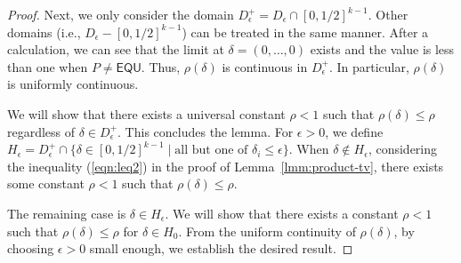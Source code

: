 \documentclass[letterpaper,11pt]{article}
\newcommand{\equ}{\textsf{EQU}\xspace}
\begin{document}
\begin{proof}
  Next, we only consider the domain $D_\epsilon^{+}=D_\epsilon\cap[0,1/2]^{k-1}$.
  Other domains (i.e., $D_\epsilon-[0,1/2]^{k-1}$) can be treated in the same manner.
  After a calculation,
  we can see that the limit at $\delta=(0,\ldots,0)$ exists and the value is less than one when $P\neq \equ$.
  Thus, $\rho(\delta)$ is continuous in $D_\epsilon^{+}$.
  In particular, $\rho(\delta)$ is uniformly continuous.

  We will show that there exists a universal constant $\rho<1$ such that $\rho(\delta)\leq \rho$ regardless of $\delta \in D_{\epsilon}^{+}$.
  This concludes the lemma.
  For $\epsilon>0$, 
  we define $H_\epsilon=D_{\epsilon}^{+}\cap \{\delta\in [0,1/2]^{k-1}\mid \mbox{all but one of }\delta_i \leq \epsilon \}$.
  When $\delta \not \in  H_{\epsilon}$, 
  considering the inequality (\ref{eqn:leq2}) in the proof of Lemma~\ref{lmm:product-tv},
  there exists some constant $\rho<1$ such that $\rho(\delta)\leq \rho$.

  The remaining case is $\delta\in H_\epsilon$.
  We will show that there exists a constant $\rho<1$ such that $\rho(\delta)\leq \rho$ for $\delta\in H_0$.
  From the uniform continuity of $\rho(\delta)$, 
  by choosing $\epsilon>0$ small enough,
  we establish the desired result.


\end{proof}
\end{document}
